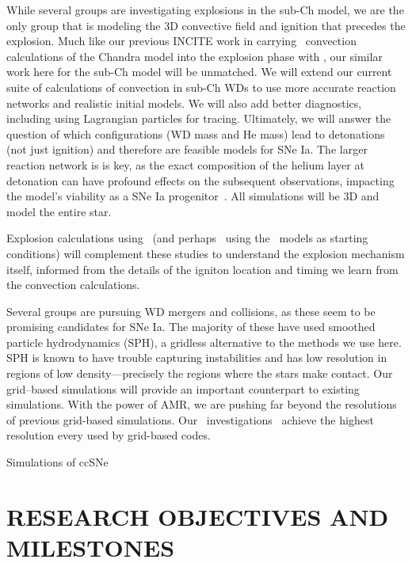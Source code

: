 \documentclass[11pt,letterpaper,english]{article}
\begin{document}
While several groups are investigating explosions in the sub-Ch model,
we are the only group that is modeling the 3D convective field and
ignition that precedes the explosion.  Much like our previous INCITE
work in carrying \maestro\ convection calculations of the Chandra
model into the explosion phase with \castro, our similar work here for
the sub-Ch model will be unmatched.  We will extend our current suite
of calculations of convection in sub-Ch WDs to use more accurate
reaction networks and realistic initial models.  We will also add
better diagnostics, including using Lagrangian particles for tracing.
Ultimately, we will answer the question of which configurations (WD
mass and He mass) lead to detonations (not just ignition) and
therefore are feasible models for SNe Ia.  The larger reaction network
is is key, as the exact composition of the helium layer at detonation
can have profound effects on the subsequent observations, impacting
the model's viability as a SNe Ia progenitor~\cite{kromer:2010}.  All
simulations will be 3D and model the entire star.

Explosion calculations using \flash\ (and perhaps \castro\ using the
\maestro\ models as starting conditions) will complement these studies
to understand the explosion mechanism itself, informed from the
details of the igniton location and timing we learn from the
convection calculations.
 
Several groups are pursuing WD mergers and collisions, as these seem  
to be promising candidates for SNe Ia.  The majority of these have
used smoothed particle hydrodynamics (SPH), a gridless alternative to
the methods we use here.  SPH is known to have trouble capturing
instabilities and has low resolution in regions of low
density---precisely the regions where the stars make contact.  Our
grid--based simulations will provide an important counterpart to
existing simulations.  With the power of AMR, we are pushing far
beyond the resolutions of previous grid-based simulations.  Our
\castro\ investigations~\cite{katz:2016}  achieve the highest
resolution every used by grid-based codes.  

Simulations of ccSNe 


\section{RESEARCH OBJECTIVES AND MILESTONES }  
\end{document}
